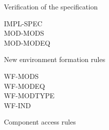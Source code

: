 Verification of the specification
\begin{description}
\item[IMPL-SPEC]
\item[MOD-MODS]
\item[MOD-MODEQ]
\end{description}
New environment formation rules
\begin{description}
\item[WF-MODS]
\item[WF-MODEQ]
\item[WF-MODTYPE]
\item[WF-IND]
\end{description}
Component access rules
